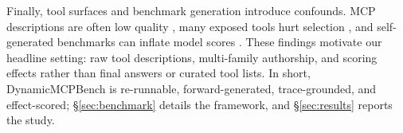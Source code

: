 Finally, tool surfaces and benchmark generation introduce confounds. MCP
descriptions are often low quality \citep{hasan2026model, wang2026docs}, many
exposed tools hurt selection \citep{gan2025rag}, and self-generated benchmarks
can inflate model scores \citep{yuan2026silencer}. These findings motivate our
headline setting: raw tool descriptions, multi-family authorship, and scoring
effects rather than final answers or curated tool lists. In short,
DynamicMCPBench is re-runnable, forward-generated, trace-grounded, and
effect-scored; \S\ref{sec:benchmark} details the framework, and
\S\ref{sec:results} reports the study.
